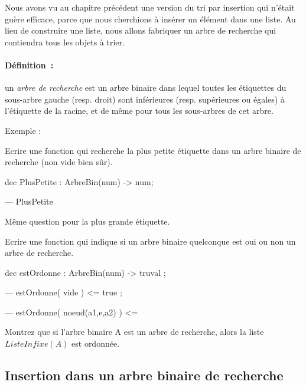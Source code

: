 Nous avons vu au chapitre précédent une version du tri par insertion
qui n'était guère efficace, parce que nous cherchions à insérer un
élément dans une liste. Au lieu de construire une liste, nous allons
fabriquer un arbre de recherche qui contiendra tous les objets à
trier.

\paragraph*{Définition~:} un \emph{arbre de recherche} 
est un arbre binaire dans lequel toutes les étiquettes du sous-arbre
gauche (resp. droit) sont inférieures (resp. supérieures ou égales) à
l'étiquette de la racine, et de m\^eme pour tous les sous-arbres de
cet arbre.

Exemple : 
\begin{center}

\end{center}

\begin{exercice}
Ecrire une fonction qui recherche la plus petite étiquette dans un
arbre binaire de recherche (non vide bien s\^ur).
\begin{verbatimtab}
dec PlusPetite : ArbreBin(num) -> num;

--- PlusPetite
\end{verbatimtab}

M\^eme question pour la plus grande étiquette.
\end{exercice}


\begin{exercice}
 Ecrire une fonction qui indique si un arbre binaire quelconque est oui ou non un arbre de recherche.
\begin{verbatimtab}
dec estOrdonne : ArbreBin(num) -> truval ;

--- estOrdonne( vide ) <= true ;

--- estOrdonne( noeud(a1,e,a2) ) <= 
\end{verbatimtab}

\end{exercice}

\begin{exercice}
Montrez que si l'arbre binaire A est un arbre de recherche, alors la
liste $ListeInfixe(A)$ est ordonnée.
\end{exercice}

\subsection{Insertion dans un arbre binaire de recherche}

